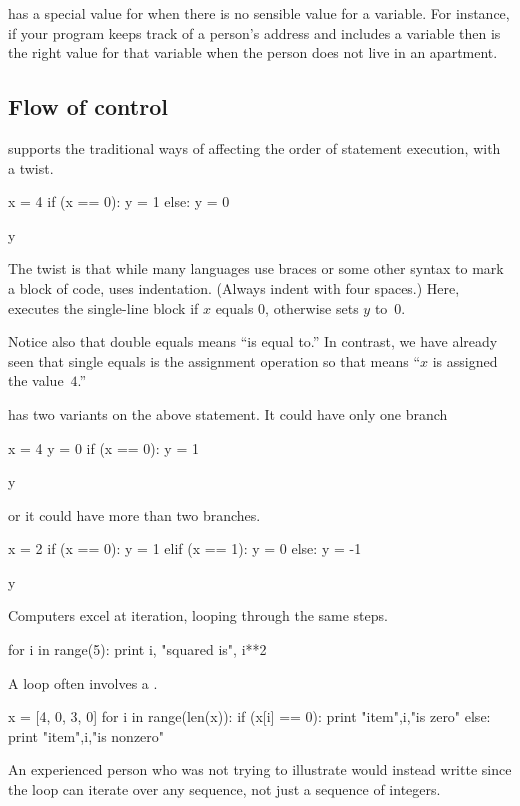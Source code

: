 \python{} has a special value  for
when there is no sensible value for a variable.
For instance, if your program keeps track of a person's address and
includes a variable  then  is
the right value for that variable when the person does not live in an
apartment.



\subsection{Flow of control}
\python{} supports the traditional ways of affecting the order of 
statement execution, with a twist.
\begin{pythonoutput}
x = 4
if (x == 0):
    y = 1
else:
    y = 0

y
\end{pythonoutput}
\noindent
The twist is that while many languages use braces or some other syntax to
mark a block of code, \python{} uses indentation.
(Always indent with four spaces.)
Here, \python{} executes the single-line block  if $x$
equals $0$, otherwise \python{} sets $y$ to~$0$. 

Notice also that double equals \inlinecode{==} means ``is equal to.'' 
In contrast, we have already seen that single equals is the assignment
operation so that  
means ``$x$ is assigned the value~$4$.'' 

\python{} has two variants on the above  statement.
It could have only one branch
\begin{pythonoutput}
x = 4
y = 0
if (x == 0):
    y = 1

y
\end{pythonoutput}
or it could have more than two branches.
\begin{pythonoutput}
x = 2
if (x == 0):
    y = 1
elif (x == 1):
    y = 0
else:
    y = -1

y
\end{pythonoutput}

Computers excel at iteration, looping through the same steps.
\begin{pythonoutput}
for i in range(5):
    print i, "squared is", i**2

\end{pythonoutput}
\noindent
A  loop often involves a .
\begin{pythonoutput}
x = [4, 0, 3, 0]
for i in range(len(x)):
    if (x[i] == 0):
        print "item",i,"is zero"
    else:
        print "item",i,"is nonzero"

\end{pythonoutput}
An experienced \python{} person who was not trying to illustrate 
would instead writte  since
the  loop can iterate over any sequence, not just
a sequence of integers.

